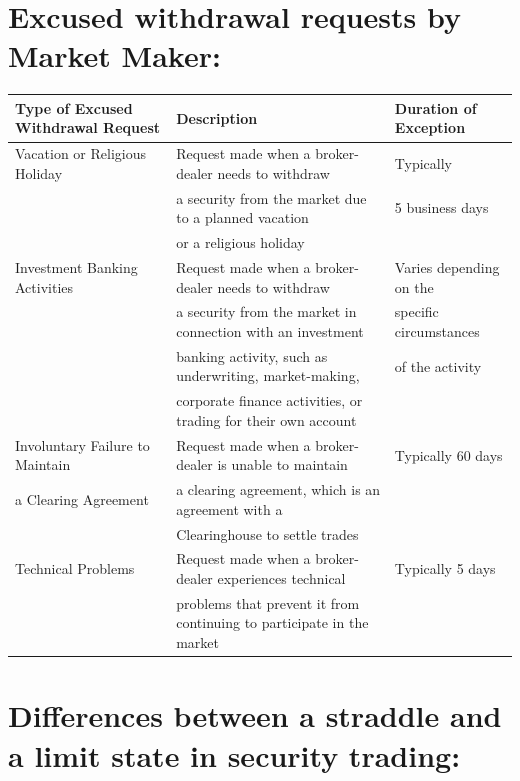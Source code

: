 \documentclass[11pt]{article}
\begin{document}
\section{Excused withdrawal requests by Market Maker:}
\label{sec:orgf83704d}

\begin{center}
\begin{tabular}{lll}
Type of Excused Withdrawal Request & Description & Duration of Exception\\[0pt]
\hline
Vacation or Religious Holiday & Request made when a broker-dealer needs to withdraw & Typically\\[0pt]
 & a security from the market due to a planned vacation & 5 business days\\[0pt]
 & or a religious holiday & \\[0pt]
Investment Banking Activities & Request made when a broker-dealer needs to withdraw & Varies depending on the\\[0pt]
 & a security from the market in connection with an investment & specific circumstances\\[0pt]
 & banking activity, such as underwriting, market-making, & of the activity\\[0pt]
 & corporate finance activities, or trading for their own account & \\[0pt]
Involuntary Failure to Maintain & Request made when a broker-dealer is unable to maintain & Typically 60 days\\[0pt]
a Clearing Agreement & a clearing agreement, which is an agreement with a & \\[0pt]
 & Clearinghouse to settle trades & \\[0pt]
Technical Problems & Request made when a broker-dealer experiences technical & Typically 5 days\\[0pt]
 & problems that prevent it from continuing to participate in the market & \\[0pt]
\end{tabular}
\end{center}

\section{Differences between a straddle and a limit state in security trading:}
\label{sec:orgb09b305}
\end{document}
